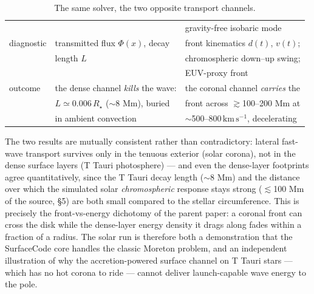 \documentclass[11pt,a4paper]{article}
\newcommand{\kms}{\,\mathrm{km\,s^{-1}}}
\begin{document}
\begin{table}[h]
\begin{tabular}{lll}
 & & gravity-free isobaric mode\\
diagnostic & transmitted flux $\Phi(x)$, decay & front kinematics $d(t)$, $v(t)$;\\
 & length $L$ & chromospheric down--up swing;\\
 & & EUV-proxy front\\
outcome & the dense channel \emph{kills} the wave: & the coronal channel \emph{carries} the\\
 & $L\simeq0.006\,R_\star$ ($\sim$8 Mm), buried & front across $\gtrsim$100--200 Mm at\\
 & in ambient convection & $\sim$500--800$\kms$, decelerating\\
\bottomrule
\end{tabular}
\caption{The same solver, the two opposite transport channels.}
\end{table}

\noindent The two results are mutually consistent rather than contradictory: lateral
fast-wave transport survives only in the tenuous exterior (solar corona), not in the
dense surface layers (T Tauri photosphere) --- and even the dense-layer footprints agree
quantitatively, since the T Tauri decay length ($\sim$8 Mm) and the distance over which
the simulated solar \emph{chromospheric} response stays strong ($\lesssim$100 Mm of the
source, \S5) are both small compared to the stellar circumference. This is precisely the
front-vs-energy dichotomy of the parent paper: a coronal front can cross the disk while
the dense-layer energy density it drags along fades within a fraction of a radius. The
solar run is therefore both a demonstration that the SurfaceCode core handles the
classic Moreton problem, and an independent illustration of why the accretion-powered
surface channel on T Tauri stars --- which has no hot corona to ride --- cannot deliver
launch-capable wave energy to the pole.
\end{document}
